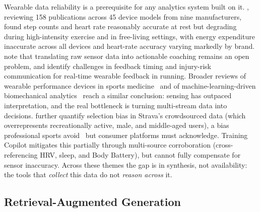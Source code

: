 Wearable data reliability is a prerequisite for any analytics system built on it. \cite{fuller_reliability_2020}, reviewing 158 publications across 45 device models from nine manufacturers, found step counts and heart rate reasonably accurate at rest but degrading during high-intensity exercise and in free-living settings, with energy expenditure inaccurate across all devices and heart-rate accuracy varying markedly by brand. \cite{seckin_review_2023} note that translating raw sensor data into actionable coaching remains an open problem, and \cite{vanhooren_wearables_2020} identify challenges in feedback timing and injury-risk communication for real-time wearable feedback in running. Broader reviews of wearable performance devices in sports medicine~\citep{li_wearable_2016} and of machine-learning-driven biomechanical analytics~\citep{alzahrani_advanced_2024} reach a similar conclusion: sensing has outpaced interpretation, and the real bottleneck is turning multi-stream data into decisions. \cite{venter_bias_2023} further quantify selection bias in Strava's crowdsourced data (which overrepresents recreationally active, male, and middle-aged users), a bias professional sports avoid~\citep{bourdon_monitoring_2017} but consumer platforms must acknowledge. Training Copilot mitigates this partially through multi-source corroboration (cross-referencing HRV, sleep, and Body Battery), but cannot fully compensate for sensor inaccuracy. Across these themes the gap is in synthesis, not availability: the tools that \textit{collect} this data do not \textit{reason across} it.

\subsection{Retrieval-Augmented Generation}\label{sec:sota:rag}

